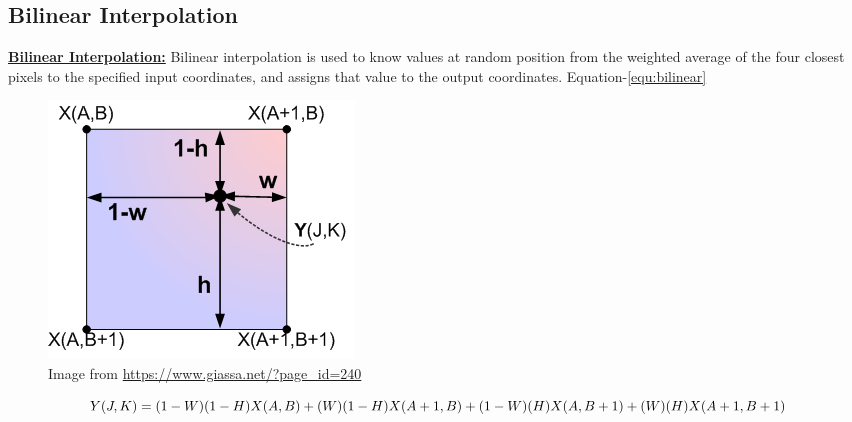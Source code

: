 \documentclass[]{article}
\begin{document}
	\subsection{Bilinear Interpolation}
		 \justifying \textbf{\underline{Bilinear Interpolation:}} Bilinear interpolation is used to know values at 	random position from the weighted average of the 	four closest pixels to the specified input coordinates, and assigns that value to the output coordinates.\cite{fadnavis2014image}  Equation-\eqref{equ:bilinear}
		 \begin{figure}[H]
		 	\centering
			\includegraphics[scale=0.5]{../Figures/bilinear_interpolation.png}
			\caption{\label{fig:bilinear_img}Image from \url{https://www.giassa.net/?page_id=240}\cite{bilinear_img}}
		\end{figure}
		\begin{equation}
		\label{equ:bilinear}
		\centering
		Y(J,K)=(1-W)(1-H)X(A,B)+(W)(1-H)X(A+1,B)+(1-W)(H)X(A,B+1)+(W)(H)X(A+1,B+1)
		\end{equation}
\end{document}
